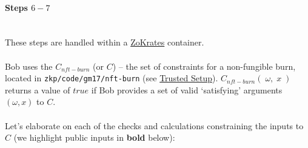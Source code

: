 \documentclass{article}
\begin{document}
\paragraph{Steps $6 - 7$}
\ \\
These steps are handled within a \hyperref[sec:zokrates]{ZoKrates} container.\\
\\
Bob uses the $C_{nft-burn}$ (or $C$) -- the set of constraints for a non-fungible burn, located in \texttt{zkp/code/gm17/nft-burn} (see \hyperref[sec:trustedSetup]{Trusted Setup}). $C_{nft-burn}(\;\omega,\;x\;)$ returns a value of $true$ if Bob provides a set of valid `satisfying' arguments $(\omega, x)$ to $C$.\\
\\
Let's elaborate on each of the checks and calculations constraining the inputs to $C$ (we highlight public inputs in \textbf{bold} below):
\end{document}
